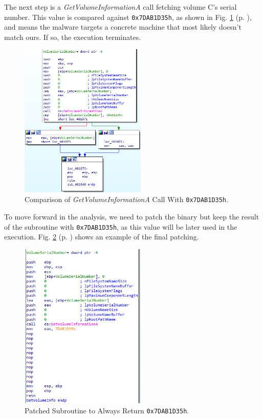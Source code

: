 The next step is a \textit{GetVolumeInformationA} call fetching volume C's serial number. This value is compared against \texttt{0x7DAB1D35h}, as shown in Fig. \ref{fig:ida_3} (p. \pageref{fig:ida_3}), and means the malware targets a concrete machine that most likely doesn't match ours. If so, the execution terminates.

\begin{figure}[H]
    \includegraphics[width=6cm]{figures/ida_3.png}
    \caption{Comparison of \textit{GetVolumeInformationA} Call With \texttt{0x7DAB1D35h}.}
    \label{fig:ida_3}
\end{figure}

To move forward in the analysis, we need to patch the binary but keep the result of the subroutine with \texttt{0x7DAB1D35h}, as this value will be later used in the execution. Fig. \ref{fig:ida_4} (p. \pageref{fig:ida_4}) shows an example of the final patching.

\begin{figure}[H]
    \includegraphics[width=6cm]{figures/ida_4.png}
    \caption{Patched Subroutine to Always Return \texttt{0x7DAB1D35h}.}
    \label{fig:ida_4}
\end{figure}

